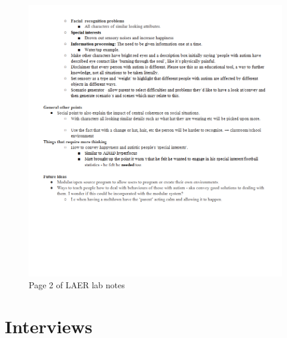 \begin{figure}[H]
\centering
\includegraphics[scale=0.7]{images/appendix/partdesign_laernotesb.png}
\caption{Page 2 of LAER lab notes}
\end{figure}

\section{Interviews}
